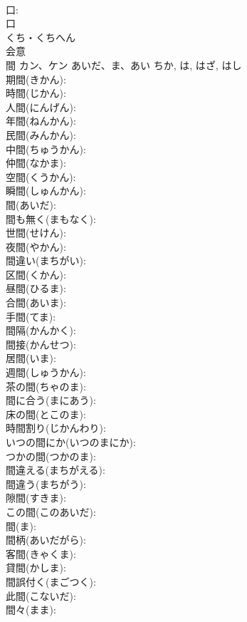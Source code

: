\documentclass[8pt]{extreport}
\begin{document}
\begin{CJK}{UTF8}{min}
\\	口: 
\\	口	
\\	くち・くちへん	
\\	会意 
\\	間	カン、ケン	あいだ、ま、あい	ちか, は, はざ, はし	
\\	期間(きかん): 
\\	時間(じかん): 
\\	人間(にんげん): 
\\	年間(ねんかん): 
\\	民間(みんかん): 
\\	中間(ちゅうかん): 
\\	仲間(なかま): 
\\	空間(くうかん): 
\\	瞬間(しゅんかん): 
\\	間(あいだ): 
\\	間も無く(まもなく): 
\\	世間(せけん): 
\\	夜間(やかん): 
\\	間違い(まちがい): 
\\	区間(くかん): 
\\	昼間(ひるま): 
\\	合間(あいま): 
\\	手間(てま): 
\\	間隔(かんかく): 
\\	間接(かんせつ): 
\\	居間(いま): 
\\	週間(しゅうかん): 
\\	茶の間(ちゃのま): 
\\	間に合う(まにあう): 
\\	床の間(とこのま): 
\\	時間割り(じかんわり): 
\\	いつの間にか(いつのまにか): 
\\	つかの間(つかのま): 
\\	間違える(まちがえる): 
\\	間違う(まちがう): 
\\	隙間(すきま): 
\\	この間(このあいだ): 
\\	間(ま): 
\\	間柄(あいだがら): 
\\	客間(きゃくま): 
\\	貸間(かしま): 
\\	間誤付く(まごつく): 
\\	此間(こないだ): 
\\	間々(まま): 

\end{CJK}
\end{document}
